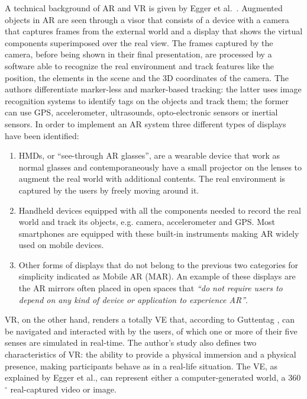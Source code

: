 A technical background of AR and VR is given by Egger et al.~\cite{egger_augmented_2020}. Augmented objects in AR are seen through a visor that consists of a device with a camera that captures frames from the external world and a display that shows the virtual components superimposed over the real view. The frames captured by the camera, before being shown in their final presentation, are processed by a software able to recognize the real environment and track features like the position, the elements in the scene and the 3D coordinates of the camera.
The authors differentiate marker-less and marker-based tracking: the latter uses image recognition systems to identify tags on the objects and track them; the former can use GPS, accelerometer, ultrasounds, opto-electronic sensors or inertial sensors.
In order to implement an AR system three different types of displays have been identified:
\begin{enumerate}
	\item \glspl{HMD}, or “see-through AR glasses”, are a wearable device that work as normal glasses and contemporaneously have a small projector on the lenses to augment the real world with additional contents. The real environment is captured by the users by freely moving around it.
	\item Handheld devices equipped with all the components needed to record the real world and track its objects, e.g. camera, accelerometer and GPS. Most smartphones are equipped with these built-in instruments making AR widely used on mobile devices.
	\item Other forms of displays that do not belong to the previous two categories for simplicity indicated as Mobile AR (MAR). An example of these displays are the AR mirrors often placed in open spaces that \textit{“do not require users to depend on any kind of device or application to experience AR”}.
\end{enumerate} 
VR, on the other hand, renders a totally VE that, according to Guttentag \cite{guttentag_virtual_2020}, can be navigated and interacted with by the users, of which one or more of their five senses are simulated in real-time. The author's study also defines two characteristics of VR: the ability to provide a physical immersion and a physical presence, making participants behave as in a real-life situation.
The VE, as explained by Egger et al., can represent either a computer-generated world, a 360$^{\circ}$ real-captured video or image.

